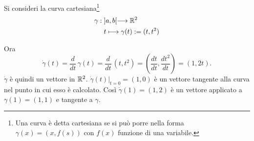 \begin{esempio}
  Si consideri la curva cartesiana\footnote{Una curva è detta cartesiana se si 
può porre 
  nella forma $\gamma(x) = (x,f(s))$ con $f(x)$ funzione di una variabile.}
  \[\begin{aligned}
    \gamma: & \; ]a,b[ \longrightarrow \mathbb{R}^{2}\\
    &\;  t\longmapsto \gamma(t):= (t,t^2)
  \end{aligned}\]
\begin{figure}[h!]
\begin{center}
{\small
\begin{inaccessibleblock}[TODO.]
{}
\end{inaccessibleblock}
}
\end{center}
\end{figure}
  Ora  
  \[
    \dot\gamma(t) = \frac{d}{dt}\, \gamma(t) = \frac{d}{dt}\, (t,t^2) = 
\left(\frac{dt}{dt},\frac{dt^2}{dt}\right)
    = \left(1,2t\right). 
  \]
  $\dot\gamma$ è quindi un vettore in $\mathbb{R}^{2}$. $\dot \gamma(t)|_{t=0} = 
(1,0)$ è un vettore
  tangente alla curva nel punto in cui esso è calcolato. Così 
$\dot\gamma(1) = (1,2)$ 
  è un vettore applicato a $\gamma(1) = (1,1)$ e tangente a $\gamma$.   
\end{esempio}

